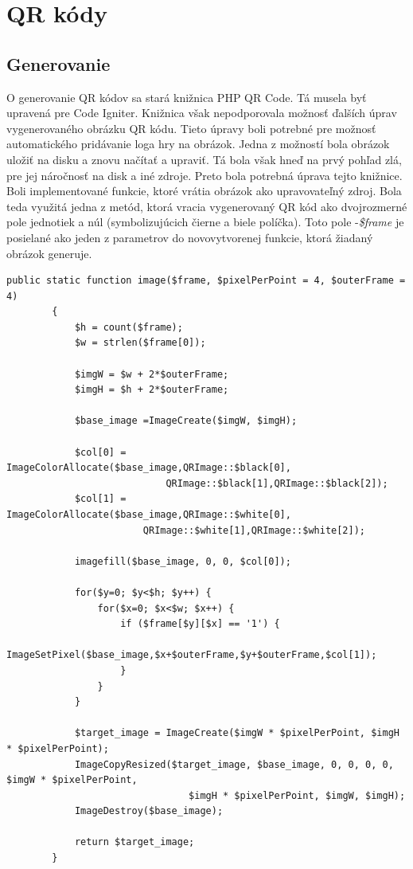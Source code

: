 \section{QR kódy}
\subsection{Generovanie}
O generovanie QR kódov sa stará knižnica PHP QR Code. Tá musela byť upravená pre Code Igniter. Knižnica však nepodporovala možnosť ďalších úprav vygenerovaného obrázku QR kódu. Tieto úpravy boli potrebné pre možnosť automatického pridávanie loga hry na obrázok. Jedna z možností bola obrázok uložiť na disku a znovu načítať a upraviť. Tá bola však hneď na prvý pohľad zlá, pre jej náročnosť na disk a iné zdroje. Preto bola potrebná úprava tejto knižnice. Boli implementované funkcie, ktoré vrátia obrázok ako upravovateľný zdroj. Bola teda využitá jedna z metód, ktorá vracia vygenerovaný QR kód ako dvojrozmerné pole jednotiek a núl (symbolizujúcich čierne a biele políčka). Toto pole -\emph{\$frame}  je posielané ako jeden z parametrov do novovytvorenej funkcie, ktorá žiadaný obrázok generuje. \

\lstset{language=PHP,
basicstyle=\tiny}
\begin{lstlisting}[frame=single]  % Start your code-block
        public static function image($frame, $pixelPerPoint = 4, $outerFrame = 4) 
        {
            $h = count($frame);
            $w = strlen($frame[0]);
            
            $imgW = $w + 2*$outerFrame;
            $imgH = $h + 2*$outerFrame;
            
            $base_image =ImageCreate($imgW, $imgH);
            
            $col[0] = ImageColorAllocate($base_image,QRImage::$black[0],
            				QRImage::$black[1],QRImage::$black[2]);
            $col[1] = ImageColorAllocate($base_image,QRImage::$white[0],
           				QRImage::$white[1],QRImage::$white[2]);

            imagefill($base_image, 0, 0, $col[0]);

            for($y=0; $y<$h; $y++) {
                for($x=0; $x<$w; $x++) {
                    if ($frame[$y][$x] == '1') {
                        ImageSetPixel($base_image,$x+$outerFrame,$y+$outerFrame,$col[1]); 
                    }
                }
            }
            
            $target_image = ImageCreate($imgW * $pixelPerPoint, $imgH * $pixelPerPoint);
            ImageCopyResized($target_image, $base_image, 0, 0, 0, 0, $imgW * $pixelPerPoint, 
            					$imgH * $pixelPerPoint, $imgW, $imgH);
            ImageDestroy($base_image);
            
            return $target_image;
        }
\end{lstlisting}


